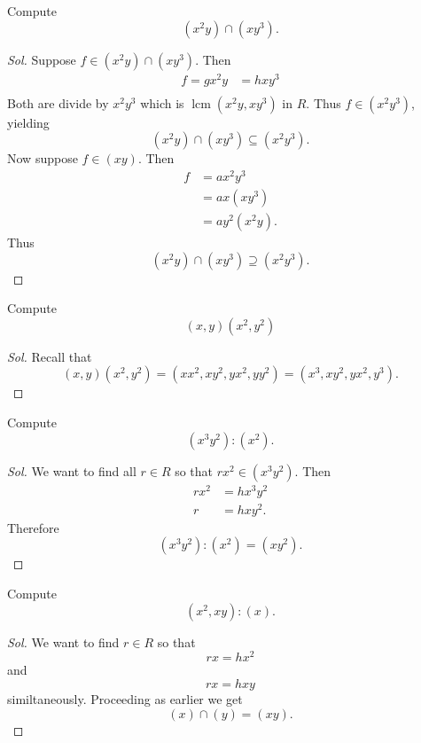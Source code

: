 \documentclass[11pt]{article}
\begin{document}
\begin{prob}
    Compute 
    \[
        (x^2y) \cap (xy^3). 
    \]
\end{prob}
\begin{proof}[Sol]
    Suppose $f \in (x^2y) \cap (xy^3)$. Then 
    \begin{align*}
        f = gx^2y &= hxy^3 \\
    \end{align*}
    Both are divide by $x^2y^3$ which is 
    $\operatorname{lcm}(x^2y, xy^3)$ in $R$.
    Thus $f \in (x^2y^3)$, yielding 
    \[
        (x^2y) \cap (xy^3) \subseteq (x^2y^3). 
    \]
    Now suppose $f \in (xy)$. Then 
    \begin{align*}
        f &= ax^2y^3 \\ 
          &= ax(xy^3) \\ 
          &= ay^2(x^2y). 
    \end{align*}
    Thus 
    \[
        (x^2y) \cap (xy^3) \supseteq (x^2y^3). 
    \]
\end{proof}

\begin{prob}
    Compute 
    \[
        (x,y)(x^2,y^2)
    \]
\end{prob}
\begin{proof}[Sol]
    Recall that 
    \[
        (x,y)(x^2,y^2) 
        = (xx^2, xy^2, yx^2, yy^2) 
        = (x^3, xy^2, yx^2, y^3). 
    \]
\end{proof}

\begin{prob}
    Compute 
    \[
        (x^3y^2) : (x^2). 
    \]
\end{prob}
\begin{proof}[Sol]
    We want to find all $r \in R$ so that 
    $rx^2 \in (x^3y^2)$. 
    Then 
    \begin{align*}
        rx^2 &= hx^3y^2 \\ 
        r &= hxy^2. 
    \end{align*}
    Therefore 
    \[
        (x^3y^2) : (x^2) = (xy^2). 
    \]
\end{proof}

\begin{prob}
    Compute 
    \[
        (x^2, xy) : (x). 
    \]
\end{prob}
\begin{proof}[Sol]
    We want to find $r \in R$ so that 
    \[
        rx = hx^2 
    \]
    and 
    \[
        rx = hxy 
    \]
    similtaneously. 
    Proceeding as earlier we get 
    \[
        (x) \cap (y) = (xy). 
    \]
\end{proof}
\end{document}
